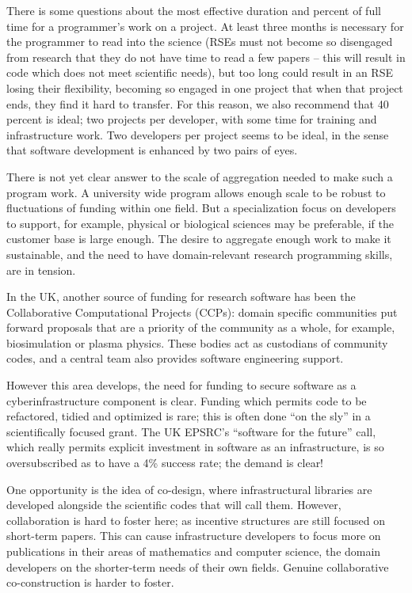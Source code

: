 There is some questions about the most effective duration and percent of full
time for a programmer's work on a project. At least three months is necessary
for the programmer to read into the science (RSEs must not become so disengaged
from research that they do not have time to read a few papers -- this will result
in code which does not meet scientific needs), but too long could result in an
RSE losing their flexibility, becoming so engaged in one project that when that
project ends, they find it hard to transfer. For this reason, we also recommend
that 40 percent is ideal; two projects per developer, with some time for
training and infrastructure work. Two developers per project seems to be ideal,
in the sense that software development is enhanced by two pairs of eyes.

There is not yet clear answer to the scale of aggregation needed to make
such a program work. A university wide program allows enough scale to be robust
to fluctuations of funding within one field. But a specialization focus on
developers to support, for example, physical or biological sciences may be
preferable, if the customer base is large enough. The desire to aggregate enough
work to make it sustainable, and the need to have domain-relevant research
programming skills, are in tension.

In the UK, another source of funding for research software has been the
Collaborative Computational Projects (CCPs): domain specific communities put
forward proposals that are a priority of the community as a whole, for example,
biosimulation or plasma physics. These bodies act as custodians of community
codes, and a central team also provides software engineering support.

However this area develops, the need for funding to secure software as a
cyberinfrastructure component is clear.  Funding which permits code to be
refactored, tidied and optimized is rare; this is often done ``on the sly''  in a
scientifically focused grant. The UK EPSRC's ``software for the future'' call,
which really permits explicit investment in software as an infrastructure, is so
oversubscribed as to have a 4\% success rate; the demand is clear!

One opportunity is the idea of co-design, where infrastructural libraries are
developed alongside the scientific codes that will call them. However,
collaboration is hard to foster here; as incentive structures are still focused
on short-term papers. This can cause infrastructure developers to focus more on
publications in their areas of mathematics and computer science, the domain developers on the
shorter-term needs of their own fields. Genuine collaborative co-construction is
harder to foster.

